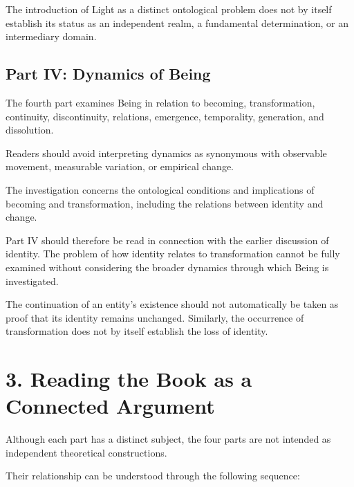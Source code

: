 The introduction of Light as a distinct
ontological problem does not by itself establish
its status as an independent realm, a fundamental
determination, or an intermediary domain.

\subsection*{Part IV: Dynamics of Being}

The fourth part examines Being in relation
to becoming, transformation, continuity,
discontinuity, relations, emergence, temporality,
generation, and dissolution.

Readers should avoid interpreting dynamics
as synonymous with observable movement,
measurable variation, or empirical change.

The investigation concerns the ontological
conditions and implications of becoming
and transformation, including the relations
between identity and change.

Part IV should therefore be read in connection
with the earlier discussion of identity.
The problem of how identity relates to
transformation cannot be fully examined
without considering the broader dynamics
through which Being is investigated.

The continuation of an entity's existence
should not automatically be taken as proof
that its identity remains unchanged. Similarly,
the occurrence of transformation does not
by itself establish the loss of identity.


\section*{3. Reading the Book as a Connected Argument}

Although each part has a distinct subject,
the four parts are not intended as independent
theoretical constructions.

Their relationship can be understood through
the following sequence:

